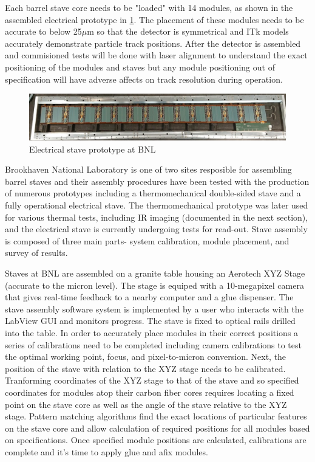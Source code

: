 Each barrel stave core needs to be "loaded" with 14 modules, as shown in the assembled electrical prototype in \ref{fig:stave}. The placement of these modules needs to be accurate to below 25$\mu$m so that the detector is symmetrical and ITk models accurately demonstrate particle track positions. After the detector is assembled and commisioned tests will be done with laser alignment to understand the exact positioning of the modules and staves but any module positioning out of specification will have adverse affects on track resolution during operation. 

\begin{figure}[!h]
        \centering
    \includegraphics[width=.8\textwidth]{Pictures/electricalstave.png}
    \caption{Electrical stave prototype at BNL}
    \label{fig:stave}
\end{figure}

Brookhaven National Laboratory is one of two sites resposible for assembling barrel staves and their assembly procedures have been tested with the production of numerous prototypes including a thermomechanical double-sided stave and a fully operational electrical stave. The thermomechanical prototype was later used for various thermal tests, including IR imaging (documented in the next section), and the electrical stave is currently undergoing tests for read-out. Stave assembly is composed of three main parts- system calibration, module placement, and  survey of results. 

Staves at BNL are assembled on a granite table housing an Aerotech XYZ Stage (accurate to the micron level). The stage is equiped with a 10-megapixel camera that gives real-time feedback to a nearby computer and a glue dispenser. The stave assembly software system is implemented by a user who interacts with the LabView GUI and monitors progress. The stave is fixed to optical rails drilled into the table. In order to accurately place modules in their correct positions a series of calibrations need to be completed including camera calibrations to test the optimal working point, focus, and pixel-to-micron conversion. Next, the position of the stave with relation to the XYZ stage needs to be calibrated. Tranforming coordinates of the XYZ stage to that of the stave and so specified coordinates for modules atop their carbon fiber cores requires locating a fixed point on the stave core as well as the angle of the stave relative to the XYZ stage. Pattern matching algorithms find the exact locations of particular features on the stave core and allow calculation of required positions for all modules based on specifications. Once specified module positions are calculated, calibrations are complete and it's time to apply glue and afix modules. 


